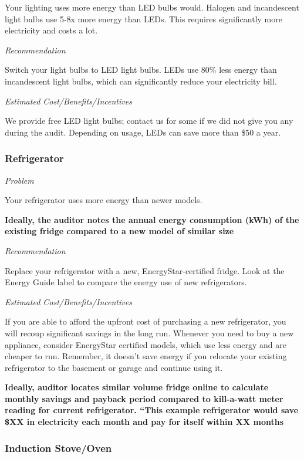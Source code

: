 \documentclass[
  letterpaper,
  DIV=11,
  numbers=noendperiod]{scrartcl}
\begin{document}
Your lighting uses more energy than LED bulbs would. Halogen and
incandescent light bulbs use 5-8x more energy than LEDs. This requires
significantly more electricity and costs a lot.

\emph{Recommendation}

Switch your light bulbs to LED light bulbs. LEDs use 80\% less energy
than incandescent light bulbs, which can significantly reduce your
electricity bill.

\emph{Estimated Cost/Benefits/Incentives}

We provide free LED light bulbs; contact us for some if we did not give
you any during the audit. Depending on usage, LEDs can save more than
\$50 a year.

\subsubsection{Refrigerator}\label{refrigerator}

\emph{Problem}

Your refrigerator uses more energy than newer models.

\textbf{Ideally, the auditor notes the annual energy consumption (kWh)
of the existing fridge compared to a new model of similar size}

\emph{Recommendation}

Replace your refrigerator with a new, EnergyStar-certified fridge. Look
at the Energy Guide label to compare the energy use of new
refrigerators.

\emph{Estimated Cost/Benefits/Incentives}

If you are able to afford the upfront cost of purchasing a new
refrigerator, you will recoup significant savings in the long run.
Whenever you need to buy a new appliance, consider EnergyStar certified
models, which use less energy and are cheaper to run. Remember, it
doesn't save energy if you relocate your existing refrigerator to the
basement or garage and continue using it.

\textbf{Ideally, auditor locates similar volume fridge online to
calculate monthly savings and payback period compared to kill-a-watt
meter reading for current refrigerator. ``This example refrigerator
would save \$XX in electricity each month and pay for itself within XX
months}

\subsubsection{Induction Stove/Oven}\label{induction-stoveoven}
\end{document}
